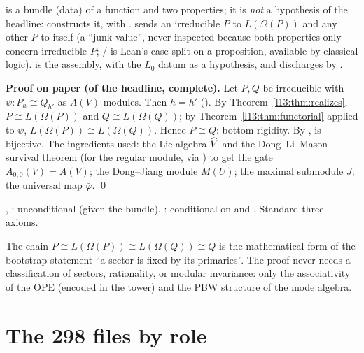 \begin{dictionary}
 is a bundle (data) of a function  and two properties; it is
\emph{not} a hypothesis of the headline:  constructs it, with
.  sends an irreducible $P$ to $L(\Omega(P))$ and any other $P$ to itself (a ``junk value'', never
inspected because both properties only concern irreducible $P$; / is Lean's
case split on a proposition, available by classical logic).  is the assembly, with the $L_0$ datum
 as a hypothesis, and  discharges  by .
\end{dictionary}

\textbf{Proof on paper (of the headline, complete).} Let $P,Q$ be irreducible with $\psi:P_h\cong Q_{h'}$ as $A(V)$-modules. Then
$h = h'$ (). By Theorem~\ref{l13:thm:realizes}, $P\cong L(\Omega(P))$ and $Q\cong L(\Omega(Q))$; by
Theorem~\ref{l13:thm:functorial} applied to $\psi$, $L(\Omega(P))\cong L(\Omega(Q))$. Hence $P\cong Q$: bottom rigidity. By
,  is bijective. The ingredients used: the Lie algebra
$\widehat{V}$ and the Dong--Li--Mason survival theorem (for the regular module, via ) to get the gate
$A_{0,0}(V) = A(V)$; the Dong--Jiang module $M(U)$; the maximal submodule $J$; the universal map $\bar\varphi$. \qed

\begin{status}
, : unconditional (given the bundle).
: conditional on  and . Standard three axioms.
\end{status}

\begin{physics}
The chain $P\cong L(\Omega(P))\cong L(\Omega(Q))\cong Q$ is the mathematical form of the bootstrap statement ``a sector is fixed by its
primaries''. The proof never needs a classification of sectors, rationality, or modular invariance: only the associativity of the
OPE (encoded in the tower) and the PBW structure of the mode algebra.
\end{physics}

\section{The 298 files by role}\label{l13:sec:files}

